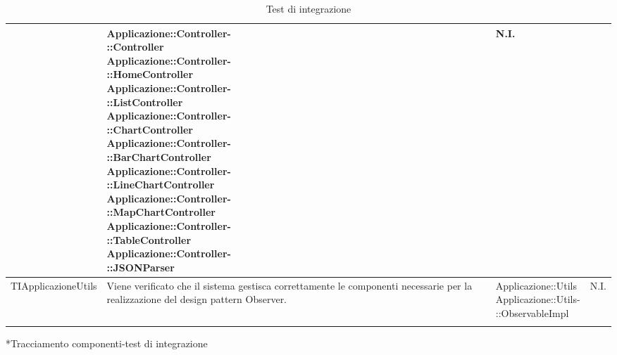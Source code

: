 \begin{longtabu}{| X | X | X[0.9] | X[0.3] |}
			& \parbox[t]{0.6\textwidth}{
			Applicazione::Controller-\\::Controller\\
			Applicazione::Controller-\\::HomeController\\
			Applicazione::Controller-\\::ListController\\
			Applicazione::Controller-\\::ChartController\\
			Applicazione::Controller-\\::BarChartController\\
			Applicazione::Controller-\\::LineChartController\\
			Applicazione::Controller-\\::MapChartController\\
			Applicazione::Controller-\\::TableController\\
			Applicazione::Controller-\\::JSONParser}
			& N.I.
\\ \hline
			TIApplicazioneUtils &
			Viene verificato che il sistema gestisca correttamente le componenti necessarie per la realizzazione del design pattern Observer.
			& \parbox[t]{0.6\textwidth}{
			Applicazione::Utils\\
			Applicazione::Utils-\\::ObservableImpl}
			& N.I. 
\\ \hline

\caption{Test di integrazione}

\end{longtabu}

	*{Tracciamento componenti-test di integrazione}


